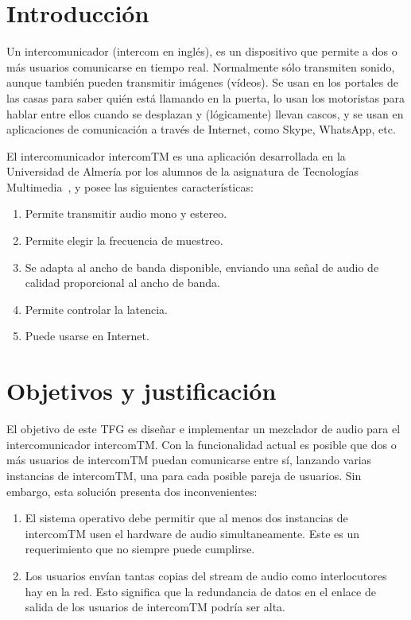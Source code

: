 \documentclass[titlepage, 12pt, a4paper, oneside]{article}
\begin{document}
\normalsize

\section{Introducción}
\label{sec:intro}
Un intercomunicador (intercom en inglés), es un dispositivo que
permite a dos o más usuarios comunicarse en tiempo real. Normalmente
sólo transmiten sonido, aunque también pueden transmitir imágenes
(vídeos). Se usan en los portales de las casas para saber quién está
llamando en la puerta, lo usan los motoristas para hablar entre ellos
cuando se desplazan y (lógicamente) llevan cascos, y se usan en
aplicaciones de comunicación a través de Internet, como Skype,
WhatsApp, etc.

El intercomunicador intercomTM es una aplicación desarrollada en la
Universidad de Almería por los alumnos de la asignatura de Tecnologías
Multimedia~\cite{intercomTM}, y posee las siguientes características:
\begin{enumerate}
\item Permite transmitir audio mono y estereo.
\item Permite elegir la frecuencia de muestreo.
\item Se adapta al ancho de banda disponible, enviando una señal de
  audio de calidad proporcional al ancho de banda.
\item Permite controlar la latencia.
\item Puede usarse en Internet.
\end{enumerate}

\section{Objetivos y justificación}
\label{sec:objetivos}
El objetivo de este TFG es diseñar e implementar un mezclador de audio
para el intercomunicador intercomTM. Con la funcionalidad actual es
posible que dos o más usuarios de intercomTM puedan comunicarse entre
sí, lanzando varias instancias de intercomTM, una para cada posible
pareja de usuarios. Sin embargo, esta solución presenta dos
inconvenientes:
\begin{enumerate}
\item El sistema operativo debe permitir que al menos dos instancias
  de intercomTM usen el hardware de audio simultaneamente. Este es un
  requerimiento que no siempre puede cumplirse.
\item Los usuarios envían tantas copias del stream de audio como
  interlocutores hay en la red. Esto significa que la redundancia de
  datos en el enlace de salida de los usuarios de intercomTM podría
  ser alta.
\end{enumerate}
\end{document}

